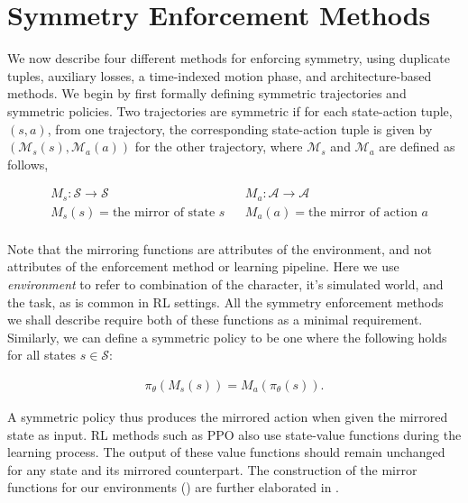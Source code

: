 \section{Symmetry Enforcement Methods}
\label{sec:methods}
We now describe four different methods for enforcing symmetry, using duplicate tuples, auxiliary losses, 
a time-indexed motion phase, and architecture-based methods.  
We begin by first formally defining symmetric trajectories and symmetric policies.  
Two trajectories are symmetric if for each state-action tuple, $(s,a)$, from one trajectory, 
the corresponding state-action tuple is given by $(\mathcal{M}_s(s), \mathcal{M}_a(a))$ 
for the other trajectory, where $\mathcal{M}_s$ and $\mathcal{M}_a$ are defined as follows,

\begin{align*}
    &M_s: \mathcal{S} \to \mathcal{S} &  &M_a: \mathcal{A} \to \mathcal{A}\\
    &M_s(s) = \text{the mirror of state } s & &M_a(a) = \text{the mirror of action } a\\
\end{align*}

Note that the mirroring functions are attributes of the environment, and
not attributes of the enforcement method or learning pipeline.  Here we use {\em environment}
to refer to combination of the character, it's simulated world, and the task, as is common
in RL settings.
All the symmetry enforcement methods we shall describe
require both of these functions as a minimal requirement.  
Similarly, we can define a symmetric policy to be one where the following holds
for all states $s \in \mathcal{S}$:

\begin{align}
    \pi_\theta(M_s(s)) = M_a(\pi_\theta(s)).
    \label{eq:symmetric-policy}
\end{align}

A symmetric policy thus produces the mirrored action when given the mirrored state as input. 
RL methods such as PPO also use state-value functions during the learning process.  
The output of these value functions should remain unchanged for any state and its mirrored counterpart.  
The construction of the mirror functions for our environments () are further 
elaborated in .

